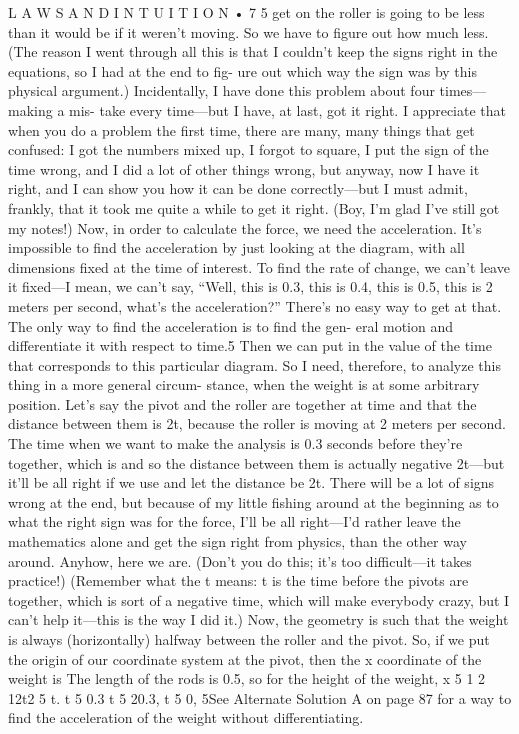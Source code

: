 \documentclass[10pt,oneside]{article}
\begin{document}
L A W S  A N D  I N T U I T I O N • 7 5 get on the roller is going to be less than it would be if it weren’t moving. So we have to figure out how much less. (The reason I went through all this is that I couldn’t keep the signs right in the equations, so I had at the end to fig- ure out which way the sign was by this physical argument.) Incidentally, I have done this problem about four times---making a mis- take every time---but I have, at last, got it right. I appreciate that when you do a problem the first time, there are many, many things that get confused: I got the numbers mixed up, I forgot to square, I put the sign of the time wrong, and I did a lot of other things wrong, but anyway, now I have it right, and I can show you how it can be done correctly---but I must admit, frankly, that it took me quite a while to get it right. (Boy, I’m glad I’ve still got my notes!) Now, in order to calculate the force, we need the acceleration. It’s impossible to find the acceleration by just looking at the diagram, with all dimensions fixed at the time of interest. To find the rate of change, we can’t leave it fixed---I mean, we can’t say, “Well, this is 0.3, this is 0.4, this is 0.5, this is 2 meters per second, what’s the acceleration?” There’s no easy way to get at that. The only way to find the acceleration is to find the gen- eral motion and differentiate it with respect to time.5 Then we can put in the value of the time that corresponds to this particular diagram. So I need, therefore, to analyze this thing in a more general circum- stance, when the weight is at some arbitrary position. Let’s say the pivot and the roller are together at time and that the distance between them is 2t, because the roller is moving at 2 meters per second. The time when we want to make the analysis is 0.3 seconds before they’re together, which is and so the distance between them is actually negative 2t---but it’ll be all right if we use and let the distance be 2t. There will be a lot of signs wrong at the end, but because of my little fishing around at the beginning as to what the right sign was for the force, I’ll be all right---I’d rather leave the mathematics alone and get the sign right from physics, than the other way around. Anyhow, here we are. (Don’t you do this; it’s too difficult---it takes practice!) (Remember what the t means: t is the time before the pivots are together, which is sort of a negative time, which will make everybody crazy, but I can’t help it---this is the way I did it.) Now, the geometry is such that the weight is always (horizontally) halfway between the roller and the pivot. So, if we put the origin of our coordinate system at the pivot, then the x coordinate of the weight is The length of the rods is 0.5, so for the height of the weight, x 5 1 2 12t2 5 t. t 5 0.3 t 5 20.3, t 5 0, 5See Alternate Solution A on page 87 for a way to find the acceleration of the weight without differentiating.\par
\end{document}
